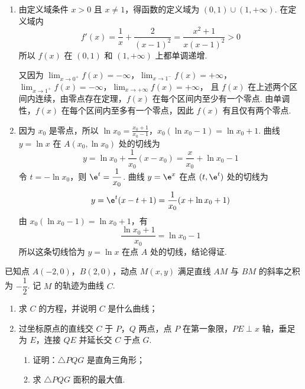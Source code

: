 \begin{solution}
\begin{enumerate}
\item 由定义域条件 \(x>0\) 且 \(x\ne1\)，得函数的定义域为 \((0,1)\cup(1,+\infty)\). 在定义域内
\[
f'(x)=\frac1x+\frac{2}{(x-1)^2}=\frac{x^2+1}{x(x-1)^2}>0
\]
所以 \(f(x)\) 在 \((0,1)\) 和 \((1,+\infty)\) 上都单调递增.

又因为
\(\lim_{x\to0^+}f(x)=-\infty\)，\(\lim_{x\to1^-}f(x)=+\infty\)，\(\lim_{x\to1^+}f(x)=-\infty\)，\(\lim_{x\to+\infty}f(x)=+\infty\)，
且 \(f(x)\) 在上述两个区间内连续，由零点存在定理，\(f(x)\) 在每个区间内至少有一个零点. 由单调性，\(f(x)\) 在每个区间内至多有一个零点，因此 \(f(x)\) 有且仅有两个零点.

\item 因为 \(x_0\) 是零点，所以
\(\ln x_0=\frac{x_0+1}{x_0-1}\)，\(x_0(\ln x_0-1)=\ln x_0+1\).
曲线 \(y=\ln x\) 在 \(A(x_0,\ln x_0)\) 处的切线为
\[
y=\ln x_0+\frac1{x_0}(x-x_0)=\frac{x}{x_0}+\ln x_0-1
\]
令 \(t=-\ln x_0\)，则 \(\e^t=\dfrac1{x_0}\). 曲线 \(y=\e^x\) 在点 \((t,\e^t)\) 处的切线为
\[
y=\e^t(x-t+1)=\frac1{x_0}(x+\ln x_0+1)
\]
由 \(x_0(\ln x_0-1)=\ln x_0+1\)，有
\[
\frac{\ln x_0+1}{x_0}=\ln x_0-1
\]
所以这条切线恰为 \(y=\ln x\) 在点 \(A\) 处的切线，结论得证.
\end{enumerate}
\end{solution}

\begin{problem}
已知点 \(A(-2,0)\)，\(B(2,0)\)，动点 \(M(x,y)\) 满足直线 \(AM\) 与 \(BM\) 的斜率之积为 \(-\dfrac12\). 记 \(M\) 的轨迹为曲线 \(C\).

\begin{enumerate}
\item 求 \(C\) 的方程，并说明 \(C\) 是什么曲线；
\item 过坐标原点的直线交 \(C\) 于 \(P\)，\(Q\) 两点，点 \(P\) 在第一象限，\(PE\perp x\) 轴，垂足为 \(E\)，连接 \(QE\) 并延长交 \(C\) 于点 \(G\).
\begin{enumerate}
\item 证明：\(\triangle PQG\) 是直角三角形；
\item 求 \(\triangle PQG\) 面积的最大值.
\end{enumerate}
\end{enumerate}
\end{problem}

